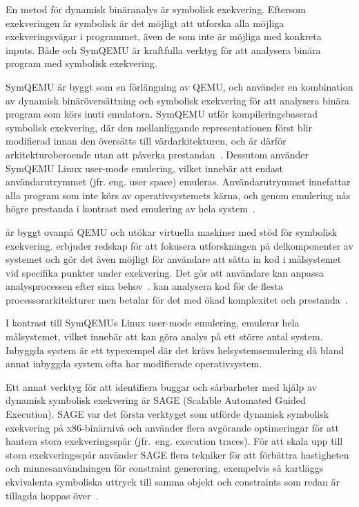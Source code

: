 En metod för dynamisk binäranalys är symbolisk exekvering. Eftersom exekveringen är symbolisk är
det möjligt att utforska alla möjliga exekveringsvägar i programmet, även de som inte är möjliga
med konkreta inputs. Både \stoe{} och SymQEMU är kraftfulla verktyg för att analysera binära program
med symbolisk exekvering.

SymQEMU är byggt som en förlängning av QEMU, och använder en kombination av
dynamisk binäröversättning och symbolisk exekvering för att analysera binära
program som körs inuti emulatorn. SymQEMU utför kompileringsbaserad symbolisk
exekvering, där den mellanliggande representationen först blir modifierad innan
den översätts till värdarkitekturen, och är därför arkitekturoberoende utan att
påverka prestandan~\cite{symqemu}. Dessutom använder SymQEMU Linux user-mode
emulering, vilket innebär att endast användarutrymmet (jfr. eng. user space)
emuleras. Användarutrymmet innefattar alla program som inte körs av
operativsystemets kärna, och genom emulering nås högre prestanda i kontrast med
emulering av hela system~\cite{symqemu}.

\stoe{} är byggt ovanpå QEMU och utökar virtuella maskiner med stöd för
symbolisk exekvering. \stoe{} erbjuder redskap för att fokusera utforskningen på
delkomponenter av systemet och gör det även möjligt för användare att sätta in
kod i målsystemet vid specifika punkter under exekvering. Det gör att användare
kan anpassa analysprocessen efter sina behov~\cite{s2e}. \stoe{} kan analysera
kod för de flesta processorarkitekturer men betalar för det med ökad komplexitet
och prestanda~\cite{symqemu}. 

I kontrast till SymQEMUs Linux user-mode emulering, emulerar \stoe{} hela
målsystemet, vilket innebär att \stoe{} kan göra analys på ett större antal
system. Inbyggda system är ett typexempel där det krävs helsystemsemulering då
bland annat inbyggda system ofta har modifierade operativsystem.

Ett annat verktyg för att identifiera buggar och sårbarheter med hjälp av dynamisk symbolisk
exekvering är SAGE (Scalable Automated Guided Execution).
SAGE var det första verktyget som utförde dynamisk symbolisk exekvering på x86-binärnivå och använder flera
avgörande optimeringar för att hantera stora exekveringsspår (jfr.\ eng. execution traces).
För att skala upp till stora exekveringsspår använder SAGE flera tekniker för att förbättra hastigheten och
minnesanvändningen för constraint generering, exempelvis så kartläggs ekvivalenta symboliska uttryck till samma
objekt och constraints som redan är tillagda hoppas över~\cite{sage}.

